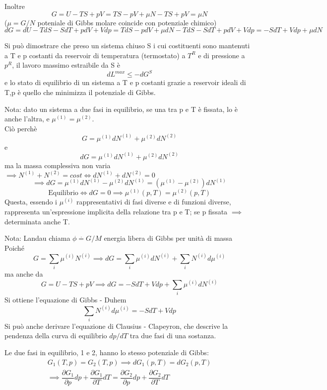 \documentclass[a4paper,11pt]{report}
\newcommand{\defeq}{\overset{\cdot}{=}}
\begin{document}
		Inoltre 
		\begin{equation}
			G = U -TS + pV = TS - pV + \mu N - TS + pV = \mu N
		\end{equation}
		($\mu = G/N $ poteniale di Gibbs molare coincide con potenziale chimico)
		\begin{equation}
			dG = dU -TdS - SdT + pdV + Vdp = TdS - pdV + \mu dN - TdS - SdT + pdV + Vdp = -SdT + Vdp + \mu dN
		\end{equation}
		
		Si può dimostrare che preso un sistema chiuso S i cui costituenti sono mantenuti a T e p costanti da reservoir di temperatura (termostato) a $T^R$ e di pressione a $p^R$, il lavoro massimo estraibile da S è 
		$$
		dL^{max} \leq -dG^S
		$$
		e lo stato di equilibrio di un sistema a T e p costanti grazie a reservoir ideali di T,p è quello che minimizza il potenziale di Gibbs.
		
		Nota: dato un sistema a due fasi in equilibrio, se una tra p e T è fissata, lo è anche l'altra, e $\mu^{(1)} = \mu^{(2)}$.\\
		Ciò perchè 
		$$
		G = \mu^{(1)} dN^{(1)} + \mu^{(2)} dN^{(2)}
		$$
		e
		$$
		dG = \mu^{(1)} dN^{(1)} + \mu^{(2)} dN^{(2)}
		$$
		ma la massa complessiva non varia $\implies N^{(1)} + N^{(2)} = cost \iff dN^{(1)} + dN^{(2)} = 0$
		$$
		\implies dG = \mu^{(1)} dN^{(1)} - \mu^{(2)} dN^{(1)} = (\mu^{(1)} - \mu^{(2)})dN^{(1)}
		$$
		$$
		\textrm{Equilibrio} \iff dG =0 \implies \mu^{(1)}(p,T) = \mu^{(2)}(p,T)
		$$
		Questa, essendo i $\mu^{(i)}$ rappresentativi di fasi diverse e di funzioni diverse, rappresenta un'espressione implicita della relazione tra p e T; se p fissata $\implies$ determinata anche T.
		
		Nota: Landau chiama $\phi \defeq G/M$ energia libera di Gibbs per unità di massa\\
		
		Poiché 
		$$
		G= \sum_i \mu^{(i)} N^{(i)} \implies dG = \sum_i \mu^{(i)} dN^{(i)} + \sum_i N^{(i)} d\mu^{(i)}
		$$
		ma anche da 
		$$
		G = U - TS + pV \implies dG = -SdT + Vdp + \sum_i \mu^{(i)} dN^{(i)}
		$$
		Si ottiene l'equazione di Gibbs - Duhem
		\begin{equation}
			\sum_i N^{(i)} d\mu^{(i)} = -SdT + Vdp
		\end{equation}
		Si può anche derivare l'equazione di Clausius - Clapeyron, che descrive la pendenza della curva di equilibrio $dp/dT$ tra due fasi di una sostanza.
		
		Le due fasi in equilibrio, 1 e 2, hanno lo stesso potenziale di Gibbs:
		\begin{multline}
			G_1(T,p) = G_2 (T,p) \implies dG_1(p,T)= dG_2(p,T) \\
			\implies \dfrac{\partial G_1}{\partial p} dp + \dfrac{\partial G_1}{\partial T}dT = \dfrac{\partial G_2}{\partial p}dp + \dfrac{\partial G_2}{\partial T}dT
		\end{multline}
\end{document}
